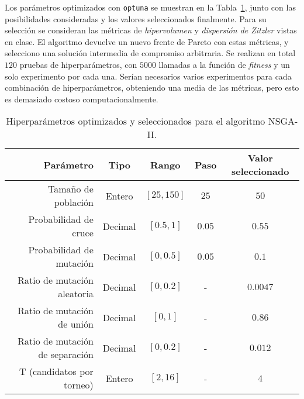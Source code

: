 Los parámetros optimizados con \lstinline{optuna} se muestran en la
Tabla~\ref{tab:ej2-params}, junto con las posibilidades consideradas y los
valores seleccionados finalmente. Para su selección se consideran las métricas
de \emph{hipervolumen} y \emph{dispersión de Zitzler} vistas en clase. El
algoritmo devuelve un nuevo frente de Pareto con estas métricas, y selecciono
una solución intermedia de compromiso arbitraria. Se realizan en total \(120\)
pruebas de hiperparámetros, con \(5000\) llamadas a la función de
\emph{fitness} y un solo experimento por cada una. Serían necesarios varios
experimentos para cada combinación de hiperparámetros, obteniendo una media de
las métricas, pero esto es demasiado costoso computacionalmente.

\begin{table}[!htbp]
\centering
\begin{tabular}{|r||cccc|}
\hline
Parámetro                       & Tipo    & Rango         & Paso & Valor seleccionado \\\hline
Tamaño de población             & Entero  & $[25, 150]$ & $25$   & $50$                 \\
Probabilidad de cruce           & Decimal & $[0.5, 1]$  & $0.05$ & $0.55$               \\
Probabilidad de mutación        & Decimal & $[0, 0.5]$  & $0.05$ & $0.1$                \\
Ratio de mutación aleatoria     & Decimal & $[0, 0.2]$  & -    & $0.0047$             \\
Ratio de mutación de unión      & Decimal & $[0, 1]$    & -    & $0.86$               \\
Ratio de mutación de separación & Decimal & $[0, 0.2]$  & -    & $0.012$              \\
T (candidatos por torneo)       & Entero  & $[2, 16]$   & -    & $4$                  \\\hline
\end{tabular}
\caption{Hiperparámetros optimizados y seleccionados para el algoritmo NSGA-II.}
\label{tab:ej2-params}
\end{table}



